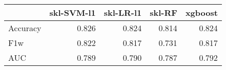 \begin{tabular}{lrrrr}
\toprule
{} &  skl-SVM-l1 &  skl-LR-l1 &  skl-RF &  xgboost \\
\midrule
Accuracy &       0.826 &      0.824 &   0.814 &    0.824 \\
F1w      &       0.822 &      0.817 &   0.731 &    0.817 \\
AUC      &       0.789 &      0.790 &   0.787 &    0.792 \\
\bottomrule
\end{tabular}

